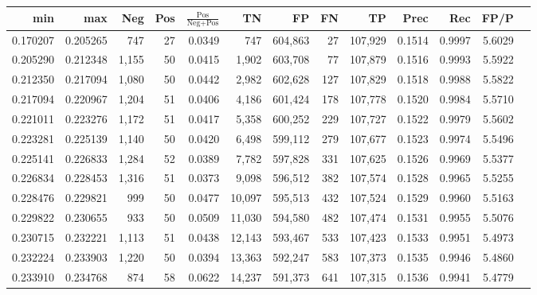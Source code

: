 \begin{tabular}{rrrrrrrrrrrrr}
\toprule
     min &      max &   Neg & Pos & $\frac{\text{Pos}}{\text{Neg}+\text{Pos}}$ &      TN &      FP &      FN &      TP &   Prec &    Rec &   FP/P \\
\midrule
0.170207 & 0.205265 &   747 &  27 &                                     0.0349 &     747 & 604,863 &      27 & 107,929 & 0.1514 & 0.9997 & 5.6029 \\
0.205290 & 0.212348 & 1,155 &  50 &                                     0.0415 &   1,902 & 603,708 &      77 & 107,879 & 0.1516 & 0.9993 & 5.5922 \\
0.212350 & 0.217094 & 1,080 &  50 &                                     0.0442 &   2,982 & 602,628 &     127 & 107,829 & 0.1518 & 0.9988 & 5.5822 \\
0.217094 & 0.220967 & 1,204 &  51 &                                     0.0406 &   4,186 & 601,424 &     178 & 107,778 & 0.1520 & 0.9984 & 5.5710 \\
0.221011 & 0.223276 & 1,172 &  51 &                                     0.0417 &   5,358 & 600,252 &     229 & 107,727 & 0.1522 & 0.9979 & 5.5602 \\
0.223281 & 0.225139 & 1,140 &  50 &                                     0.0420 &   6,498 & 599,112 &     279 & 107,677 & 0.1523 & 0.9974 & 5.5496 \\
0.225141 & 0.226833 & 1,284 &  52 &                                     0.0389 &   7,782 & 597,828 &     331 & 107,625 & 0.1526 & 0.9969 & 5.5377 \\
0.226834 & 0.228453 & 1,316 &  51 &                                     0.0373 &   9,098 & 596,512 &     382 & 107,574 & 0.1528 & 0.9965 & 5.5255 \\
0.228476 & 0.229821 &   999 &  50 &                                     0.0477 &  10,097 & 595,513 &     432 & 107,524 & 0.1529 & 0.9960 & 5.5163 \\
0.229822 & 0.230655 &   933 &  50 &                                     0.0509 &  11,030 & 594,580 &     482 & 107,474 & 0.1531 & 0.9955 & 5.5076 \\
0.230715 & 0.232221 & 1,113 &  51 &                                     0.0438 &  12,143 & 593,467 &     533 & 107,423 & 0.1533 & 0.9951 & 5.4973 \\
0.232224 & 0.233903 & 1,220 &  50 &                                     0.0394 &  13,363 & 592,247 &     583 & 107,373 & 0.1535 & 0.9946 & 5.4860 \\
0.233910 & 0.234768 &   874 &  58 &                                     0.0622 &  14,237 & 591,373 &     641 & 107,315 & 0.1536 & 0.9941 & 5.4779 \\

\end{tabular}
